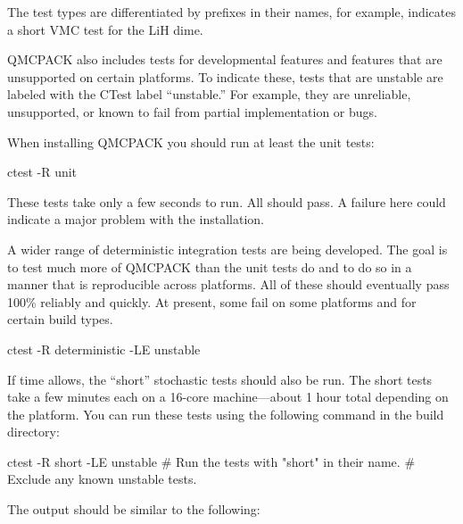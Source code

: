 The test types are differentiated by prefixes in their names, for example,  indicates a short VMC test
for the LiH dime. 

QMCPACK also includes tests for developmental features and features
that are unsupported on certain platforms. To indicate these, tests
that are unstable are labeled with the CTest label
``unstable.'' For example, they are unreliable, unsupported, or known to fail
from partial implementation or bugs.

When installing QMCPACK you should run at least the unit tests:

\begin{shade}
 ctest -R unit
 \end{shade}
 
These tests take only a few seconds to run. All should pass. A
failure here could indicate a major problem with the installation.

A wider range of deterministic integration
tests are being developed. The goal is to test much more of QMCPACK than the unit tests
do and to do so in a manner that is reproducible
across platforms. All of these should eventually pass 100\% reliably
and quickly. At present, some fail on some platforms and for certain
build types.

 \begin{shade}
 ctest -R deterministic -LE unstable
 \end{shade}

If time allows, the ``short'' stochastic tests should also be run.
The short tests take a few minutes each on a 16-core machine---about 1 hour total depending on the platform. You can run these tests using the following command in the
build directory:


\begin{shade}
ctest -R short -LE unstable  # Run the tests with "short" in their name.
                             # Exclude any known unstable tests.
\end{shade}
The output should be similar to the following:



